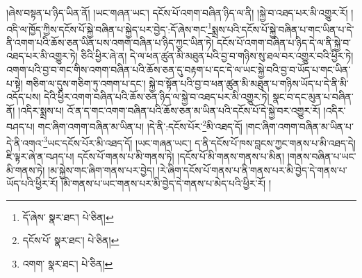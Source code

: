 །ཞེས་བསྟན་པ་ཉིད་ཡིན་ནོ། །ཡང་གཞན་ཡང་། དངོས་པོ་འགག་བཞིན་ཉིད་ལ་ནི། །སྐྱེ་བ་འཐད་པར་མི་འགྱུར་རོ། །འདི་ལ་ཁྱོད་ཀྱིས་དངོས་པོ་སྐྱེ་བཞིན་པ་སྐྱེད་པར་བྱེད་:དོ་ཞེས་གང་\footnote{དོ་ཞེས་  སྣར་ཐང་།  པེ་ཅིན། }སྨྲས་པའི་དངོས་པོ་སྐྱེ་བཞིན་པ་གང་ཡིན་པ་དེ་ནི་འགག་པའི་ཆོས་ཅན་ཡིན་པས་འགག་བཞིན་པ་ཉིད་ཀྱང་ཡིན་ཏེ། དངོས་པོ་འགག་བཞིན་པ་ཉིད་དེ་ལ་ནི་སྐྱེ་བ་འཐད་པར་མི་འགྱུར་ཏེ། ཅིའི་ཕྱིར་ཞེ་ན། དེ་ལ་ཕན་ཚུན་མི་མཐུན་པའི་བྱ་བ་གཉིས་སུ་ཐལ་བར་འགྱུར་བའི་ཕྱིར་ཏེ། འགག་པའི་བྱ་བ་གང་གིས་འགག་བཞིན་པའི་ཆོས་ཅན་དུ་བརྟག་པ་དང་དེ་ལ་ཡང་སྐྱེ་བའི་བྱ་བ་ཡོད་པ་གང་ཡིན་པ་སྟེ། གཅིག་ལ་དུས་གཅིག་ཏུ་འགག་པ་དང་། སྐྱེ་བ་སྟོན་པའི་བྱ་བ་ཕན་ཚུན་མི་མཐུན་པ་གཉིས་ཡོད་པ་དེ་ནི་མི་འདོད་པས། དེའི་ཕྱིར་འགག་བཞིན་པའི་ཆོས་ཅན་ཉིད་ལ་སྐྱེ་བ་འཐད་པར་མི་འགྱུར་ཏེ། སྣང་བ་དང་མུན་པ་བཞིན་ནོ། །འདིར་སྨྲས་པ། འོ་ན་ད་གང་འགག་བཞིན་པའི་ཆོས་ཅན་མ་ཡིན་པའི་དངོས་པོ་དེ་སྐྱེ་བར་འགྱུར་རོ། །འདིར་བཤད་པ། གང་ཞིག་འགག་བཞིན་མ་ཡིན་པ། །དེ་ནི་:དངོས་པོར་\footnote{དངོས་པོ་  སྣར་ཐང་།  པེ་ཅིན། }མི་འཐད་དོ། །གང་ཞིག་འགག་བཞིན་མ་ཡིན་པ་དེ་ནི་འགའ་\footnote{འགག་  སྣར་ཐང་།  པེ་ཅིན། }ཡང་དངོས་པོར་མི་འཐད་དོ། །ཡང་གཞན་ཡང་། ད་ནི་དངོས་པོ་ཁས་བླངས་ཀྱང་གནས་པ་མི་འཐད་དེ། ཇི་ལྟར་ཞེ་ན་བཤད་པ། དངོས་པོ་གནས་པ་མི་གནས་ཏེ། །དངོས་པོ་མི་གནས་གནས་པ་མིན། །གནས་བཞིན་པ་ཡང་མི་གནས་ཏེ། །མ་སྐྱེས་གང་ཞིག་གནས་པར་བྱེད། །རེ་ཞིག་དངོས་པོ་གནས་པ་ནི་གནས་པར་མི་བྱེད་དེ་གནས་པ་ཡོད་པའི་ཕྱིར་རོ། །མི་གནས་པ་ཡང་གནས་པར་མི་བྱེད་དེ་གནས་པ་མེད་པའི་ཕྱིར་རོ། །
